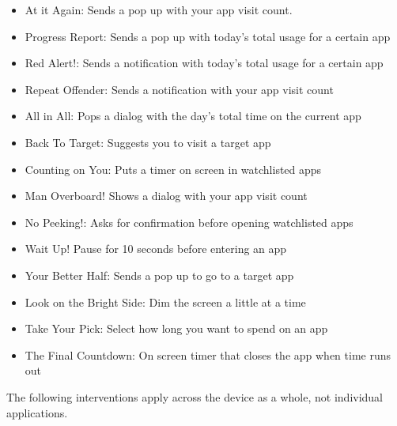 \begin{small}

\begin{itemize}
    \item At it Again: Sends a pop up with your app visit count.
    \item Progress Report: Sends a pop up with today's total usage for a certain app
    \item Red Alert!: Sends a notification with today's total usage for a certain app
    \item Repeat Offender: Sends a notification with your app visit count
    \item All in All: Pops a dialog with the day's total time on the current app
    \item Back To Target: Suggests you to visit a target app
    \item Counting on You: Puts a timer on screen in watchlisted apps
    \item Man Overboard! Shows a dialog with your app visit count
    \item No Peeking!: Asks for confirmation before opening watchlisted apps
    \item Wait Up! Pause for 10 seconds before entering an app
    \item Your Better Half: Sends a pop up to go to a target app
    \item Look on the Bright Side: Dim the screen a little at a time
    \item Take Your Pick: Select how long you want to spend on an app
    \item The Final Countdown: On screen timer that closes the app when time runs out
\end{itemize}

\end{small}


The following interventions apply across the device as a whole, not individual applications.

